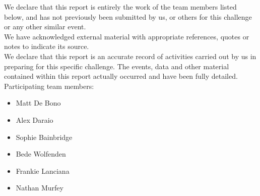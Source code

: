 We declare that this report is entirely the work of the team members listed below, and has not previously been submitted by us, or others for this challenge or any other similar event.\\

We have acknowledged external material with appropriate references, quotes or notes to indicate its source.\\

We declare that this report is an accurate record of activities carried out by us in preparing for this specific challenge. The events, data and other material contained within this report actually occurred and have been fully detailed.\\

Participating team members:
\begin{itemize}
	\item Matt De Bono
	\item Alex Daraio
	\item Sophie Bainbridge
	\item Bede Wolfenden
	\item Frankie Lanciana
	\item Nathan Murfey
\end{itemize}